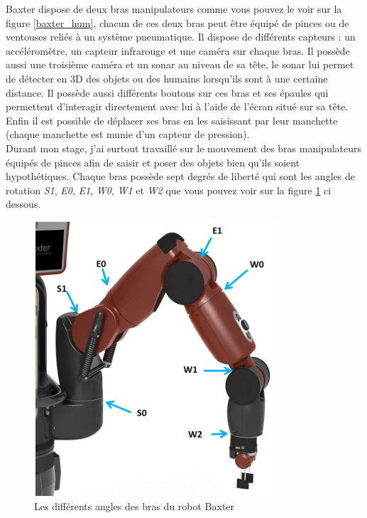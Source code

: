\documentclass[a4paper,french, titlepage]{book}
\begin{document}
Baxter dispose de deux bras manipulateurs comme vous pouvez le voir sur la figure \ref{baxter_hum}, chacun de ces deux bras peut être équipé de pinces ou de ventouses reliés à un système pneumatique. Il dispose de différents capteurs : un accéléromètre, un capteur infrarouge et une caméra sur chaque bras. Il possède aussi une troisième caméra et un sonar au niveau de sa tête, le sonar lui permet de détecter en 3D des objets ou des humains lorsqu'ils sont à une certaine distance. Il possède aussi différents boutons sur ces bras et ses épaules qui permettent d'interagir directement avec lui à l'aide de l'écran situé sur sa tête. Enfin il est possible de déplacer ses bras en les saisissant par leur manchette (chaque manchette est munie d'un capteur de pression).\\

Durant mon stage, j'ai surtout travaillé sur le mouvement des bras manipulateurs équipés de pinces afin de saisir et poser des objets bien qu'ils soient hypothétiques. Chaque bras possède sept degrés de liberté qui sont les angles de rotation \emph{S1}, \emph{E0}, \emph{E1}, \emph{W0}, \emph{W1} et \emph{W2} que vous pouvez voir sur la figure \ref{Baxter_arm} ci dessous.



\begin{figure}[H] 
\begin{center}
\includegraphics[scale=0.7]{Images/Baxter_arm.png} 
\end{center}
\caption{Les différents angles des bras du robot Baxter}
\label{Baxter_arm}
\end{figure} 
\end{document}
